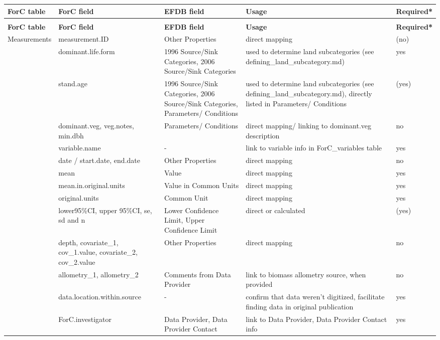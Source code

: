 \documentclass[, manuscript]{copernicus}
\begin{document}
\begin{longtabu} to 
\hline
\textbf{ForC table} & \textbf{ForC field} & \textbf{EFDB field} & \textbf{Usage} & \textbf{Required*}\\
\hline
\endfirsthead
{}\\
\hline
\textbf{ForC table} & \textbf{ForC field} & \textbf{EFDB field} & \textbf{Usage} & \textbf{Required*}\\
\hline
\endhead
Measurements & measurement.ID & Other Properties & direct mapping & (no)\\
\hline
 & dominant.life.form & 1996 Source/Sink Categories, 2006 Source/Sink Categories & used to determine land subcategories (see defining\_land\_subcategory.md) & yes\\
\hline
 & stand.age & 1996 Source/Sink Categories, 2006 Source/Sink Categories, Parameters/ Conditions & used to determine land subcategories (see defining\_land\_subcategory.md), directly listed in Parameters/ Conditions & (yes)\\
\hline
 & dominant.veg, veg.notes, min.dbh & Parameters/ Conditions & direct mapping/ linking to dominant.veg description & no\\
\hline
 & variable.name & - & link to variable info in ForC\_variables table & yes\\
\hline
 & date / start.date, end.date & Other Properties & direct mapping & no\\
\hline
 & mean & Value & direct mapping & yes\\
\hline
 & mean.in.original.units & Value in Common Units & direct mapping & yes\\
\hline
 & original.units & Common Unit & direct mapping & yes\\
\hline
 & lower95\%CI, upper 95\%CI, se, sd and n & Lower Confidence Limit, Upper Confidence Limit & direct or calculated & (yes)\\
\hline
 & depth, covariate\_1, cov\_1.value, covariate\_2, cov\_2.value & Other Properties & direct mapping & no\\
\hline
 & allometry\_1, allometry\_2 & Comments from Data Provider & link to biomass allometry source, when provided & no\\
\hline
 & data.location.within.source & - & confirm that data weren't digitized, facilitate finding data in original publication & yes\\
\hline
 & ForC.investigator & Data Provider, Data Provider Contact & link to Data Provider, Data Provider Contact info & yes\\

\end{longtabu}
\end{document}
